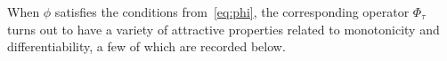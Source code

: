 \documentclass[10pt]{article}
\numberwithin{equation}{section}
\newcommand{\+}{%
	\raisebox{0.18ex}{\scaleobj{0.55}{+}}
}
\theoremstyle{definition}
\theoremstyle{definition}
\newcommand\numberthis{\addtocounter{equation}{1}\tag{\theequation}}
\begin{document}
\noindent 
When $\phi$ satisfies the conditions from~\eqref{eq:phi}, the corresponding operator $\Phi_\tau$ turns out to have a variety of attractive properties related to monotonicity and differentiability, a few of which are recorded below.
\noindent
\end{document}
